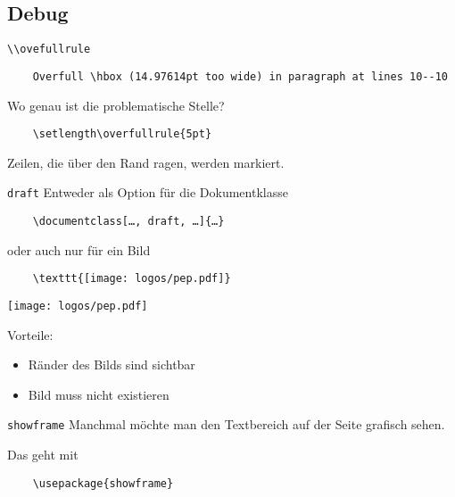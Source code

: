 \subsection{Debug}

\begin{frame}[fragile]{\lstinline+\\ovefullrule+}

  \vspace{\baselineskip}
  \begin{lstlisting}
    Overfull \hbox (14.97614pt too wide) in paragraph at lines 10--10
  \end{lstlisting}
  Wo genau ist die problematische Stelle?

  \vspace{\baselineskip}
  \begin{lstlisting}
    \setlength\overfullrule{5pt}
  \end{lstlisting}

  \setlength\overfullrule{5pt}

  \vspace{\baselineskip}
  Zeilen, die über den Rand ragen, werden markiert.
\end{frame}

\begin{frame}[fragile]{\texttt{draft}}
  Entweder als Option für die Dokumentklasse
  \begin{lstlisting}
    \documentclass[…, draft, …]{…}
  \end{lstlisting}
  oder auch nur für ein Bild
  \begin{lstlisting}
    \texttt{[image: logos/pep.pdf]}
  \end{lstlisting}
  \texttt{[image: logos/pep.pdf]}

  Vorteile:
  \begin{itemize}
    \item Ränder des Bilds sind sichtbar
    \item Bild muss nicht existieren
  \end{itemize}
\end{frame}

\AddToShipoutPictureFG*{\ShowFramePicture}
\begin{frame}[fragile]{\texttt{showframe}}
  Manchmal möchte man den Textbereich auf der Seite grafisch sehen.

  Das geht mit
  \begin{lstlisting}
    \usepackage{showframe}
  \end{lstlisting}
\end{frame}

